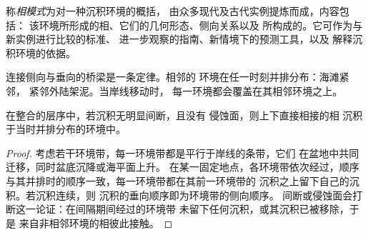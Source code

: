 \begin{definition}[相模式]\label{def:b3:facies-models:model}
称\emph{相模式}为对一种沉积环境的概括，
由众多现代及古代实例提炼而成，内容包括：
该环境所形成的相、它们的几何形态、侧向关系以及
所构成的。它可作为与新实例进行比较的标准、
进一步观察的指南、新情境下的预测工具，以及
解释沉积环境的依据。
\end{definition}

连接侧向与垂向的桥梁是一条定律。相邻的
环境在任一时刻并排分布：海滩紧邻，
紧邻外陆架泥。当岸线移动时，
每一环境都会覆盖在其相邻环境之上。

\begin{theorem}[沃尔瑟定律]\label{thm:b3:facies-models:walther}
在整合的层序中，若沉积无明显间断，且没有
侵蚀面，则上下直接相接的相
沉积于当时并排分布的环境中。
\end{theorem}

\begin{proof}
考虑若干环境带，每一环境带都是平行于岸线的条带，它们
在盆地中共同迁移，同时盆底沉降或海平面上升。
在某一固定地点，各环境带依次经过，顺序
与其并排时的顺序一致，每一环境带都在其前一环境带的
沉积之上留下自己的沉积。若沉积连续，则
沉积的垂向顺序即为环境带的侧向顺序。
间断或侵蚀面会打断这一论证：在间隔期间经过的环境带
未留下任何沉积，或其沉积已被移除，于是
来自非相邻环境的相彼此接触。
\end{proof}

